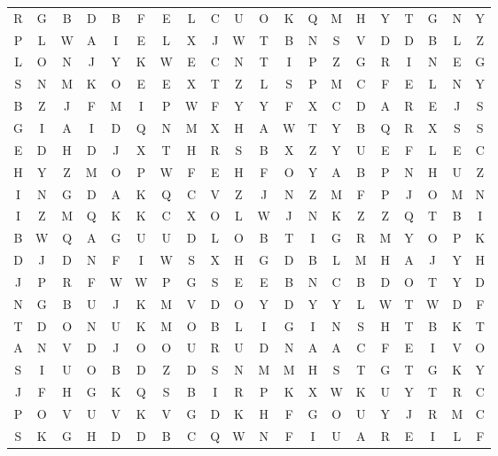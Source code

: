 \documentclass{standalone}
\begin{document}
\begin{center}
\renewcommand{\arraystretch}{1.5}{
\noindent\begin{tabular}{cccccccccccccccccccc}R & G & B & D & B & F & E & L & C & U & O & K & Q & M & H & Y & T & G & N & Y \\ 
P & L & W & A & I & E & L & X & J & W & T & B & N & S & V & D & D & B & L & Z \\ 
L & O & N & J & Y & K & W & E & C & N & T & I & P & Z & G & R & I & N & E & G \\ 
S & N & M & K & O & E & E & X & T & Z & L & S & P & M & C & F & E & L & N & Y \\ 
B & Z & J & F & M & I & P & W & F & Y & Y & F & X & C & D & A & R & E & J & S \\ 
G & I & A & I & D & Q & N & M & X & H & A & W & T & Y & B & Q & R & X & S & S \\ 
E & D & H & D & J & X & T & H & R & S & B & X & Z & Y & U & E & F & L & E & C \\ 
H & Y & Z & M & O & P & W & F & E & H & F & O & Y & A & B & P & N & H & U & Z \\ 
I & N & G & D & A & K & Q & C & V & Z & J & N & Z & M & F & P & J & O & M & N \\ 
I & Z & M & Q & K & K & C & X & O & L & W & J & N & K & Z & Z & Q & T & B & I \\ 
B & W & Q & A & G & U & U & D & L & O & B & T & I & G & R & M & Y & O & P & K \\ 
D & J & D & N & F & I & W & S & X & H & G & D & B & L & M & H & A & J & Y & H \\ 
J & P & R & F & W & W & P & G & S & E & E & B & N & C & B & D & O & T & Y & D \\ 
N & G & B & U & J & K & M & V & D & O & Y & D & Y & Y & L & W & T & W & D & F \\ 
T & D & O & N & U & K & M & O & B & L & I & G & I & N & S & H & T & B & K & T \\ 
A & N & V & D & J & O & O & U & R & U & D & N & A & A & C & F & E & I & V & O \\ 
S & I & U & O & B & D & Z & D & S & N & M & M & H & S & T & G & T & G & K & Y \\ 
J & F & H & G & K & Q & S & B & I & R & P & K & X & W & K & U & Y & T & R & C \\ 
P & O & V & U & V & K & V & G & D & K & H & F & G & O & U & Y & J & R & M & C \\ 
S & K & G & H & D & D & B & C & Q & W & N & F & I & U & A & R & E & I & L & F
\end{tabular}
}
\end{center}
\end{document}
